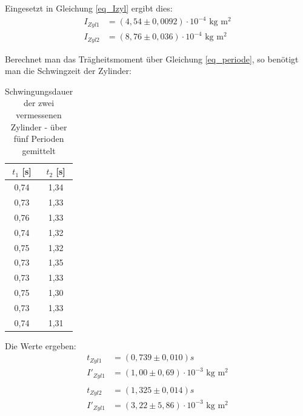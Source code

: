 Eingesetzt in Gleichung \eqref{eq_Izyl} ergibt dies:
\begin{align*}
I_{Zyl 1}&=(4,54\pm0,0092)\cdot10^{-4}\text{ kg m$^2$}\\
I_{Zyl 2}&=(8,76\pm0,036)\cdot10^{-4}\text{ kg m$^2$}
\end{align*}

Berechnet man das Trägheitsmoment über Gleichung \eqref{eq_periode}, so benötigt man die Schwingzeit der Zylinder:
\begin{table}[htbp]
\begin{tabular}{|c|c|}
\hline 
$t_1$ [s] & $t_2$ [s]\\ \hline
0,74&	1,34\\ \hline
0,73&	1,33\\ \hline
0,76&	1,33\\ \hline
0,74&	1,32\\ \hline
0,75&	1,32\\ \hline
0,73&	1,35\\ \hline
0,73&	1,33\\ \hline
0,75&	1,30\\ \hline
0,73&	1,33\\ \hline
0,74&	1,31\\ \hline
\end{tabular} 
\caption{Schwingungsdauer der zwei vermessenen Zylinder - über fünf Perioden gemittelt}
\end{table}

Die Werte ergeben:
\begin{align*}
t_{Zyl 1}&=(0,739 \pm 0,010)s\\
I'_{Zyl 1}&=(1,00\pm0,69)\cdot10^{-3}\text{ kg m$^2$}\\
\end{align*}
\begin{align*}
t_{Zyl 2}&=(1,325 \pm  0,014)s\\ 
I'_{Zyl 1}&=(3,22\pm5,86)\cdot10^{-3}\text{ kg m$^2$}
\end{align*}

